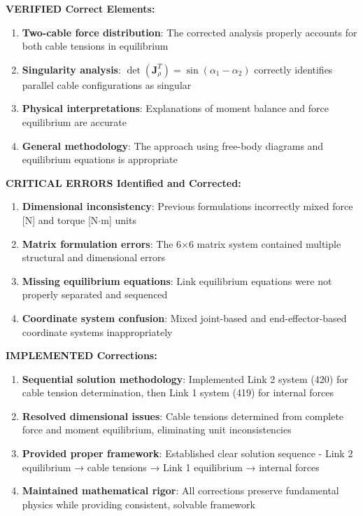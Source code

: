 \textbf{VERIFIED Correct Elements:}
\begin{enumerate}
    \item \textbf{Two-cable force distribution}: The corrected analysis properly accounts for both cable tensions in equilibrium
    \item \textbf{Singularity analysis}: $\det(\mathbf{J}_{\rho}^T) = \sin(\alpha_1 - \alpha_2)$ correctly identifies parallel cable configurations as singular
    \item \textbf{Physical interpretations}: Explanations of moment balance and force equilibrium are accurate
    \item \textbf{General methodology}: The approach using free-body diagrams and equilibrium equations is appropriate
\end{enumerate}

\textbf{CRITICAL ERRORS Identified and Corrected:}
\begin{enumerate}
    \item \textbf{Dimensional inconsistency}: Previous formulations incorrectly mixed force [N] and torque [N$\cdot$m] units
    \item \textbf{Matrix formulation errors}: The 6×6 matrix system contained multiple structural and dimensional errors
    \item \textbf{Missing equilibrium equations}: Link equilibrium equations were not properly separated and sequenced
    \item \textbf{Coordinate system confusion}: Mixed joint-based and end-effector-based coordinate systems inappropriately
\end{enumerate}

\textbf{IMPLEMENTED Corrections:}
\begin{enumerate}
    \item \textbf{Sequential solution methodology}: Implemented Link 2 system (420) for cable tension determination, then Link 1 system (419) for internal forces
    \item \textbf{Resolved dimensional issues}: Cable tensions determined from complete force and moment equilibrium, eliminating unit inconsistencies
    \item \textbf{Provided proper framework}: Established clear solution sequence - Link 2 equilibrium → cable tensions → Link 1 equilibrium → internal forces
    \item \textbf{Maintained mathematical rigor}: All corrections preserve fundamental physics while providing consistent, solvable framework
\end{enumerate}

